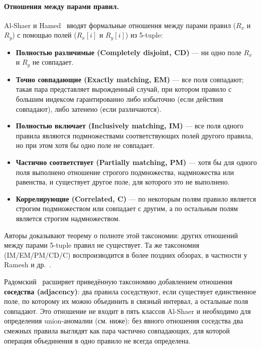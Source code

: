 \paragraph{Отношения между парами правил.} Al-Shaer и Hamed~\cite{al2003firewall} вводят формальные отношения между парами правил ($R_x$ и $R_y$) с помощью полей ($R_x[i]$ и $R_y[i]$) из 5-tuple:
\begin{itemize}
    \item \textbf{Полностью различимые (Completely disjoint, CD)} --- ни одно поле $R_x$ и $R_y$ не совпадает.
    \item \textbf{Точно совпадающие (Exactly matching, EM)} --- все поля совпадают; такая пара представляет вырожденный случай, при котором правило с большим индексом гарантированно либо избыточно (если действия совпадают), либо затенено (если различаются).
    \item \textbf{Полностью включает (Inclusively matching, IM)} --- все поля одного правила являются подмножествами соответствующих полей другого правила, но при этом хотя бы одно поле не совпадает.
    \item \textbf{Частично соответствует (Partially matching, PM)} --- хотя бы для одного поля выполнено отношение строгого подмножества, надмножества или равенства, и существует другое поле, для которого это не выполнено.
    \item \textbf{Коррелирующие (Correlated, C)} --- по некоторым полям правило является строгим подмножеством или совпадает с другим, а по остальным полям является строгим надмножеством.
\end{itemize}

Авторы доказывают теорему о полноте этой таксономии: других отношений между парами 5-tuple правил не существует. Та же таксономия (IM/EM/PM/CD/C) воспроизводится в более поздних обзорах, в частности у Ramesh и др.~\cite{ramesh2024exploring}.

Радомский~\cite{radomskiy2011security} расширяет приведённую таксономию добавлением отношения \textbf{соседства (adjacency)}: два правила соседствуют, если существует единственное поле, по которому их можно объединить в связный интервал, а остальные поля совпадают. Это отношение не входит в пять классов Al-Shaer и необходимо для определения union-аномалии (см. ниже): без явного отношения соседства два смежных правила выглядят как пара частично совпадающих, для которой операция объединения в одно правило не всегда определена.


